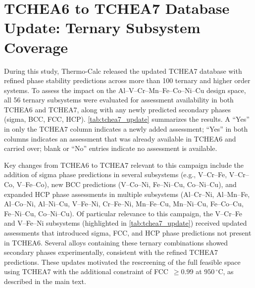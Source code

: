 \documentclass[final,5p,times,twocolumn]{elsarticle}
\begin{document}
\section{TCHEA6 to TCHEA7 Database Update: Ternary Subsystem Coverage}
\label{s1_tchea7_update}

During this study, Thermo-Calc released the updated TCHEA7 database with refined phase stability predictions across more than 100 ternary and higher order systems. To assess the impact on the Al--V--Cr--Mn--Fe--Co--Ni--Cu design space, all 56 ternary subsystems were evaluated for assessment availability in both TCHEA6 and TCHEA7, along with any newly predicted secondary phases (sigma, BCC, FCC, HCP). \autoref{tab:tchea7_update} summarizes the results. A ``Yes'' in only the TCHEA7 column indicates a newly added assessment; ``Yes'' in both columns indicates an assessment that was already available in TCHEA6 and carried over; blank or ``No'' entries indicate no assessment is available.

Key changes from TCHEA6 to TCHEA7 relevant to this campaign include the addition of sigma phase predictions in several subsystems (e.g., V--Cr--Fe, V--Cr--Co, V--Fe--Co), new BCC predictions (V--Co--Ni, Fe--Ni--Cu, Co--Ni--Cu), and expanded HCP phase assessments in multiple subsystems (Al--Cr--Ni, Al--Mn--Fe, Al--Co--Ni, Al--Ni--Cu, V--Fe--Ni, Cr--Fe--Ni, Mn--Fe--Cu, Mn--Ni--Cu, Fe--Co--Cu, Fe--Ni--Cu, Co--Ni--Cu). Of particular relevance to this campaign, the V--Cr--Fe and V--Fe--Ni subsystems (highlighted in \autoref{tab:tchea7_update}) received updated assessments that introduced sigma, FCC, and HCP phase predictions not present in TCHEA6. Several alloys containing these ternary combinations showed secondary phases experimentally, consistent with the refined TCHEA7 predictions. These updates motivated the rescreening of the full feasible space using TCHEA7 with the additional constraint of FCC~$\geq 0.99$ at $950\,^{\circ}$C, as described in the main text.
\end{document}
